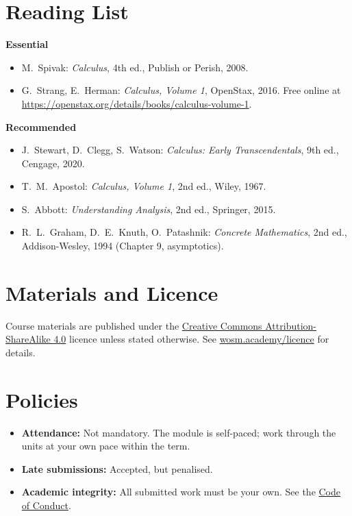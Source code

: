 \documentclass[11pt,a4paper]{article}
\begin{document}
\section{Reading List}
\textbf{Essential}
\begin{itemize}
  \item M.\ Spivak: \textit{Calculus}, 4th ed., Publish or Perish, 2008.
  \item G.\ Strang, E.\ Herman: \textit{Calculus, Volume 1}, OpenStax, 2016. Free online at \url{https://openstax.org/details/books/calculus-volume-1}.
\end{itemize}
\textbf{Recommended}
\begin{itemize}
  \item J.\ Stewart, D.\ Clegg, S.\ Watson: \textit{Calculus: Early Transcendentals}, 9th ed., Cengage, 2020.
  \item T.\ M.\ Apostol: \textit{Calculus, Volume 1}, 2nd ed., Wiley, 1967.
  \item S.\ Abbott: \textit{Understanding Analysis}, 2nd ed., Springer, 2015.
  \item R.\ L.\ Graham, D.\ E.\ Knuth, O.\ Patashnik: \textit{Concrete Mathematics}, 2nd ed., Addison-Wesley, 1994 (Chapter 9, asymptotics).
\end{itemize}

\section{Materials and Licence}
Course materials are published under the
\href{https://creativecommons.org/licenses/by-sa/4.0/}{Creative Commons Attribution-ShareAlike 4.0}
licence unless stated otherwise. See \href{https://wosm.academy/licence/}{wosm.academy/licence} for details.

\section{Policies}
\begin{itemize}
  \item \textbf{Attendance:} Not mandatory. The module is self-paced; work through the units at your own pace within the term.
  \item \textbf{Late submissions:} Accepted, but penalised.
  \item \textbf{Academic integrity:} All submitted work must be your own.
        See the \href{https://wosm.academy/code-of-conduct/}{Code of Conduct}.
\end{itemize}
\end{document}

